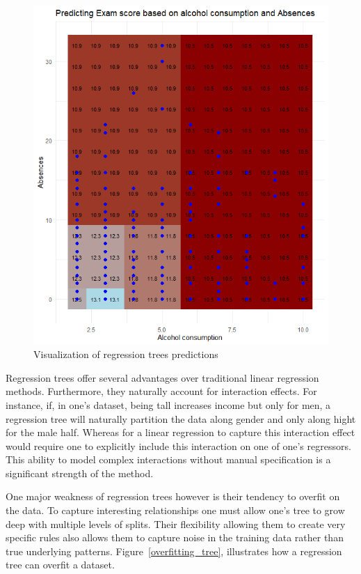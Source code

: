 \documentclass[12pt]{article}
\begin{document}
\begin{figure}
    \includegraphics[scale=0.40]{red_visual.png}
    \caption{Visualization of regression trees predictions}
    \label{red_visual}
\end{figure}

Regression trees offer several advantages over traditional linear regression methods.  Furthermore, they naturally account for interaction effects. For instance, if, in one's dataset, being tall increases income but only for men, a regression tree will naturally partition the data along gender and only along hight for the male half. Whereas for a linear regression to capture this interaction effect would require one to explicitly include this interaction on one of one's regressors. This ability to model complex interactions without manual specification is a significant strength of the method.

One major weakness of regression trees however is their tendency to overfit on the data. To capture interesting relationships one must allow one's tree to grow deep with multiple levels of splits. Their flexibility allowing them to create very specific rules also allows them to capture noise in the training data rather than true underlying patterns. Figure~\ref{overfitting_tree}, illustrates how a regression tree can overfit a dataset.
\end{document}

